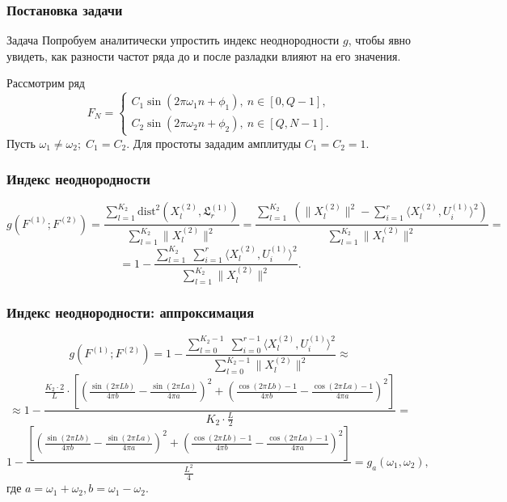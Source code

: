 \documentclass[11pt]{beamer}
\begin{document}
	\begin{frame}
		\frametitle{Постановка задачи}
		\begin{block}{Задача}
			Попробуем аналитически упростить индекс неоднородности $ g $, чтобы явно увидеть, как разности частот ряда до и после разладки влияют на его значения.
		\end{block}
		Рассмотрим ряд
		\begin{equation*} 
			F_N = 
			\begin{cases} 
				C_1\sin(2\pi\omega_1 n + \phi_1),\ n \in [0, Q-1], \\ 
				C_2\sin(2\pi\omega_2 n + \phi_2),\ n \in [Q, N-1]. 
			\end{cases} 
		\end{equation*} 
		Пусть $ \omega_1 \neq \omega_2;\; C_1 = C_2 $. Для простоты зададим амплитуды $ C_1 = C_2 = 1 $.
	\end{frame}
	
	
	\begin{frame}
		\frametitle{Индекс неоднородности}
		$$ g(F^{(1)}; F^{(2)}) = \frac{\sum\limits_{l=1}^{K_2}\mathrm{dist}^2(X_l^{(2)}, \mathfrak{L}_r^{(1)})}{\sum\limits_{l=1}^{K_2}\|X_l^{(2)}\|^2} = \frac{\sum\limits_{l=1}^{K_2}\;(\|X_l^{(2)}\|^2 - \sum\limits_{i=1}^{r}\langle X_l^{(2)}, U_i^{(1)}\rangle^2)}{\sum\limits_{l=1}^{K_2}\|X_l^{(2)}\|^2} = $$
		$$ = 1 - \frac{\sum\limits_{l=1}^{K_2}\;\sum\limits_{i=1}^{r}\langle X_l^{(2)}, U_i^{(1)}\rangle^2}{\sum\limits_{l=1}^{K_2}\|X_l^{(2)}\|^2}. $$
	\end{frame}
	
	\begin{frame}
		\frametitle{Индекс неоднородности: аппроксимация}
		\small
		$$ g(F^{(1)}; F^{(2)}) = 1 - \frac{\sum\limits_{l=0}^{K_2-1}\;\sum\limits_{i=0}^{r-1}\langle X_l^{(2)}, U_i^{(1)}\rangle^2}{\sum\limits_{l=0}^{K_2-1}\|X_l^{(2)}\|^2} \approx $$
		$$ \approx 1 - \frac{\frac{K_2 \cdot 2}{L} \cdot \left[ \left(  \frac{\sin(2\pi Lb)}{4\pi b} - \frac{\sin(2\pi La)}{4\pi a}   \right)^2 + \left(  \frac{\cos(2\pi Lb) - 1}{4\pi b} - \frac{\cos(2\pi La) - 1}{4\pi a}  \right)^2 \right]}{K_2\cdot\frac{L}{2}} = $$
		$$ 1 - \frac{\left[ \left(  \frac{\sin(2\pi Lb)}{4\pi b} - \frac{\sin(2\pi La)}{4\pi a}   \right)^2 + \left(  \frac{\cos(2\pi Lb) - 1}{4\pi b} - \frac{\cos(2\pi La) - 1}{4\pi a}  \right)^2 \right]}{\frac{L^2}{4}} = g_a(\omega_1, \omega_2),$$
		где $ a = \omega_1 + \omega_2, b = \omega_1 - \omega_2 $.
	\end{frame}
	
\end{document}
